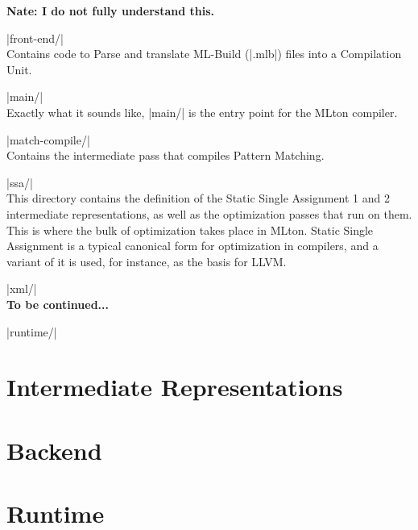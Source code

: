 \documentclass{article}
\begin{document}
\begin{description}
\begin{description}
  \textbf{Nate: I do not fully understand this.}
\item |front-end/| \\
  Contains code to Parse and translate ML-Build (|.mlb|) files into a Compilation Unit.
\item |main/| \\
  Exactly what it sounds like, |main/| is the entry point for the   MLton compiler.
\item |match-compile/| \\
  Contains the intermediate pass that compiles Pattern Matching.
\item |ssa/| \\
  This directory contains the definition of the Static Single Assignment 1 and 2 intermediate representations, as well as the optimization passes that run on them. This is where the bulk of optimization takes place in MLton. Static Single Assignment is a typical canonical form for optimization in compilers, and a variant of it is used, for instance, as the basis for LLVM.
\item |xml/| \\
  \textbf{To be continued...}
\end{description}

\item |runtime/| \\
  

\end{description}

\section{Intermediate Representations}

\section{Backend}

\section{Runtime}
\end{document}
